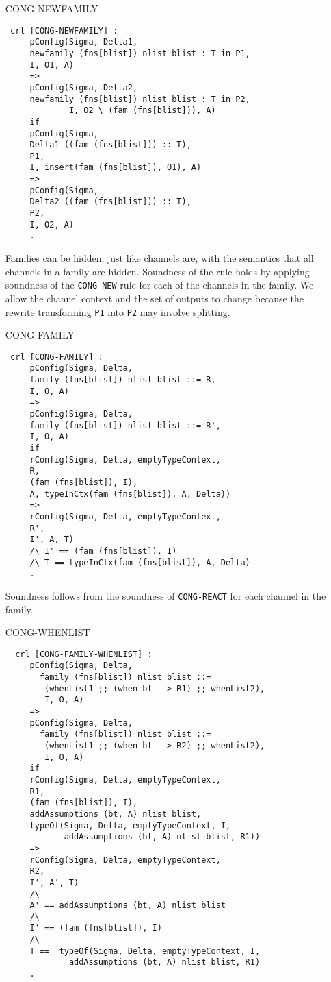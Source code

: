 \documentclass{article}
\begin{document}
\begin{itemize}
\item[CONG-NEWFAMILY]

\begin{lstlisting}
 crl [CONG-NEWFAMILY] : 
     pConfig(Sigma, Delta1, 
     newfamily (fns[blist]) nlist blist : T in P1, 
     I, O1, A)
     =>  
     pConfig(Sigma, Delta2, 
     newfamily (fns[blist]) nlist blist : T in P2, 
             I, O2 \ (fam (fns[blist])), A)
     if 
     pConfig(Sigma, 
     Delta1 ((fam (fns[blist])) :: T), 
     P1, 
     I, insert(fam (fns[blist]), O1), A)
     =>
     pConfig(Sigma, 
     Delta2 ((fam (fns[blist])) :: T), 
     P2, 
     I, O2, A)
     .
\end{lstlisting}

Families can be hidden, just like channels are, with the semantics that
all channels in a family are hidden. Soundness of the rule holds by
applying soundness of the \texttt{CONG-NEW} rule for each of the channels
in the family. We allow the channel context and the set of outputs to change because the rewrite transforming \texttt{P1} into \texttt{P2} may involve
splitting.

\item[CONG-FAMILY]

\begin{lstlisting}
 crl [CONG-FAMILY] : 
     pConfig(Sigma, Delta, 
     family (fns[blist]) nlist blist ::= R, 
     I, O, A)
     => 
     pConfig(Sigma, Delta, 
     family (fns[blist]) nlist blist ::= R', 
     I, O, A)
     if 
     rConfig(Sigma, Delta, emptyTypeContext, 
     R, 
     (fam (fns[blist]), I), 
     A, typeInCtx(fam (fns[blist]), A, Delta))
     =>
     rConfig(Sigma, Delta, emptyTypeContext, 
     R', 
     I', A, T) 
     /\ I' == (fam (fns[blist]), I)  
     /\ T == typeInCtx(fam (fns[blist]), A, Delta)
     .
\end{lstlisting}
 
 Soundness follows from the soundness of \texttt{CONG-REACT} for 
 each channel in the family.
 
 \item[CONG-WHENLIST]
 
  \begin{lstlisting}
  crl [CONG-FAMILY-WHENLIST] : 
     pConfig(Sigma, Delta, 
       family (fns[blist]) nlist blist ::= 
        (whenList1 ;; (when bt --> R1) ;; whenList2), 
        I, O, A)
     => 
     pConfig(Sigma, Delta, 
       family (fns[blist]) nlist blist ::= 
        (whenList1 ;; (when bt --> R2) ;; whenList2), 
        I, O, A) 
     if 
     rConfig(Sigma, Delta, emptyTypeContext, 
     R1, 
     (fam (fns[blist]), I), 
     addAssumptions (bt, A) nlist blist, 
     typeOf(Sigma, Delta, emptyTypeContext, I, 
            addAssumptions (bt, A) nlist blist, R1))
     =>  
     rConfig(Sigma, Delta, emptyTypeContext, 
     R2, 
     I', A', T)
     /\
     A' == addAssumptions (bt, A) nlist blist 
     /\
     I' == (fam (fns[blist]), I)
     /\
     T ==  typeOf(Sigma, Delta, emptyTypeContext, I, 
             addAssumptions (bt, A) nlist blist, R1)
     .   
  \end{lstlisting}
  

\end{itemize}
\end{document}
